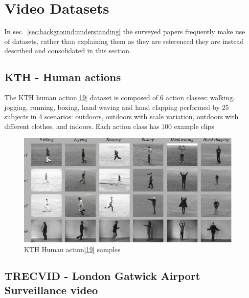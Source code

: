 \documentclass[A4paper,draft]{scrreprt}
\begin{document}
\section{Video Datasets}\label{sec:background:datasets}

In sec.~\ref{sec:background:understanding} the surveyed papers
frequently make use of datasets, rather than explaining them as they are
referenced they are instead described and consolidated in this section.

\subsection{KTH - Human actions}\label{kth---human-actions}

The KTH human
action{[}\protect\hyperlink{ref-schuldt2004_Recognizinghumanactions}{19}{]}
dataset is composed of 6 action classes: walking, jogging, running,
boxing, hand waving and hand clapping performed by 25 subjects in 4
scenarios: outdoors, outdoors with scale variation, outdoors with
different clothes, and indoors. Each action class has 100 example clips

\begin{figure}
\centering
\includegraphics{media/images/kth-sample.png}
\caption{KTH Human
action{[}\protect\hyperlink{ref-schuldt2004_Recognizinghumanactions}{19}{]}
samples}
\end{figure}

\subsection{TRECVID - London Gatwick Airport Surveillance
video}\label{trecvid---london-gatwick-airport-surveillance-video}
\end{document}

